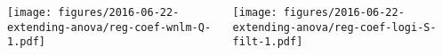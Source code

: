 \documentclass{beamer}
\begin{document}
\begin{frame}[plain, label=all-betas]
\begin{columns}[t]
\begin{column}{0.5\textwidth}

\texttt{[image: figures/2016-06-22-extending-anova/reg-coef-wnlm-Q-1.pdf]}
\end{column}

\begin{column}{0.5\textwidth}

\texttt{[image: figures/2016-06-22-extending-anova/reg-coef-logi-S-filt-1.pdf]}
\end{column}
\end{columns}
\end{frame}
\end{document}
